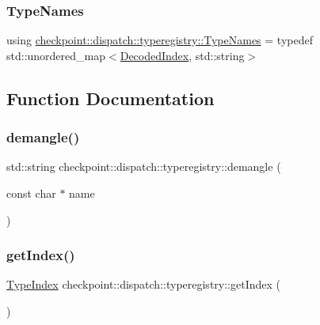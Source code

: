 \subsubsection{\texorpdfstring{Type\+Names}{TypeNames}}
{\footnotesize\ttfamily using \hyperlink{namespacecheckpoint_1_1dispatch_1_1typeregistry_ae6cc6f19ecb8f66f73fa14a1acdc9b6e}{checkpoint\+::dispatch\+::typeregistry\+::\+Type\+Names} = typedef std\+::unordered\+\_\+map$<$\hyperlink{namespacecheckpoint_1_1dispatch_1_1typeregistry_a3d1f57de0a997a245eb9e1db07b94140}{Decoded\+Index}, std\+::string$>$}



\subsection{Function Documentation}
\mbox{\label{namespacecheckpoint_1_1dispatch_1_1typeregistry_aa2dadf5c548fb89df1ac165e46e3abb1}} 
\subsubsection{\texorpdfstring{demangle()}{demangle()}}
{\footnotesize\ttfamily std\+::string checkpoint\+::dispatch\+::typeregistry\+::demangle (\begin{DoxyParamCaption}\item[{const char $\ast$}]{name }\end{DoxyParamCaption})\hspace{0.3cm}{\ttfamily [inline]}}

\mbox{\label{namespacecheckpoint_1_1dispatch_1_1typeregistry_aa75ef84e9b63a687784360ded2d56fe4}} 
\subsubsection{\texorpdfstring{get\+Index()}{getIndex()}}
{\footnotesize\ttfamily \hyperlink{namespacecheckpoint_1_1dispatch_1_1typeregistry_a40b8b0de7b59181c6b3d8f2657280467}{Type\+Index} checkpoint\+::dispatch\+::typeregistry\+::get\+Index (\begin{DoxyParamCaption}{ }\end{DoxyParamCaption})\hspace{0.3cm}{\ttfamily [inline]}}

